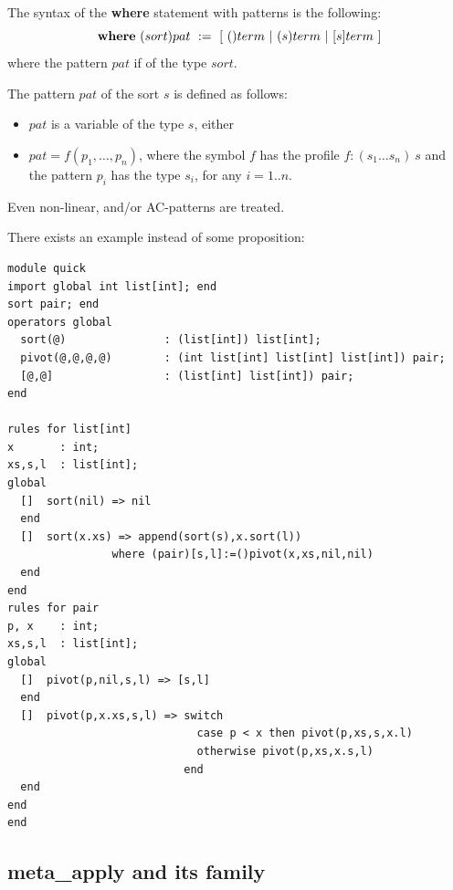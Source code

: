 \documentclass{article}
\begin{document}
{\scriptsize
The syntax of the {\bf where} statement with patterns is the following:
\[
  {\bf ~where~} (sort)pat ~:= ~[~ ()term ~|~ (s)term ~|~ [s]term ~]
\]
where the pattern $pat$ if of the type $sort$.

\noindent
The pattern $pat$ of the sort $s$ is defined as follows:
\begin{itemize}
  \item $pat$ is a variable of the type $s$, either
  \item $pat = f(p_1, \dots, p_n)$, where the symbol $f$ has the 
    profile $f:(s_1 \dots s_n)~s$ and the pattern $p_i$ has the type $s_i$,
    for any $i = 1..n$.
\end{itemize}
Even non-linear, and/or AC-patterns are treated.

There exists an example instead of some proposition:

\begin{verbatim}
module quick
import global int list[int]; end
sort pair; end
operators global
  sort(@)               : (list[int]) list[int];
  pivot(@,@,@,@)        : (int list[int] list[int] list[int]) pair;
  [@,@]                 : (list[int] list[int]) pair;
end

rules for list[int]
x       : int;
xs,s,l  : list[int];
global
  []  sort(nil) => nil                                  
  end
  []  sort(x.xs) => append(sort(s),x.sort(l))           
                where (pair)[s,l]:=()pivot(x,xs,nil,nil)
  end
end
rules for pair
p, x    : int;
xs,s,l  : list[int];
global
  []  pivot(p,nil,s,l) => [s,l]                 
  end
  []  pivot(p,x.xs,s,l) => switch
                             case p < x then pivot(p,xs,s,x.l)
                             otherwise pivot(p,xs,x.s,l)
                           end
  end
end
end
\end{verbatim}}

\subsection{meta\_apply and its family}

\end{document}
